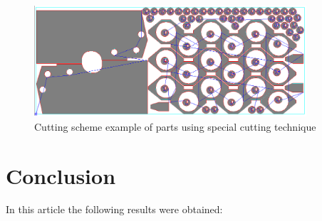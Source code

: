 \documentclass[runningheads]{llncs}
\begin{document}
\begin{figure}
  \begin{center}
  \includegraphics[width=0.9\textwidth]{spec-b.png}
  \caption{Cutting scheme example of parts using special cutting technique}
  \label{spec-b}
  \end{center}
\end{figure}

\section{Conclusion}

In this article the following results were obtained:



\nocite{*}
\end{document}

